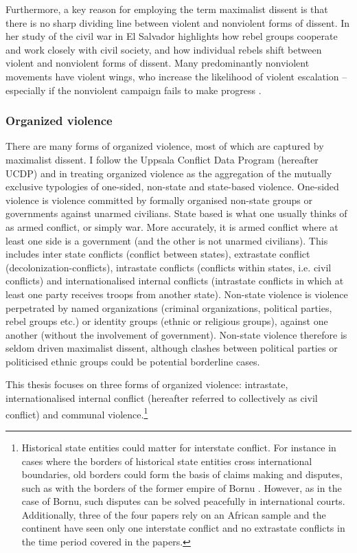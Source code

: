 Furthermore, a key reason for employing the term maximalist dissent is that
there is no sharp dividing line between violent and nonviolent forms of dissent.
In her study of the civil war in El Salvador \citet{Wood2003} highlights how
rebel groups cooperate and work closely with civil society, and how individual
rebels shift between violent and nonviolent forms of dissent. Many predominantly
nonviolent movements have violent wings, who increase the likelihood of
violent escalation -- especially if the nonviolent campaign fails to make
progress \citep{Ryckman_2019}.

\subsubsection{Organized violence}
\label{Organized violence}

There are many forms of organized violence, most of which are captured by
maximalist dissent. I follow the Uppsala Conflict Data Program (hereafter UCDP)
and \citet{Melander_2016} in treating organized violence as the aggregation of
the mutually exclusive typologies of one-sided, non-state and state-based
violence. One-sided violence is violence committed by formally organised
non-state groups or governments against unarmed civilians. State based is what
one usually thinks of as armed conflict, or simply war. More accurately, it is
armed conflict where at least one side is a government (and the other is not
unarmed civilians). This includes inter state conflicts (conflict between
states), extrastate conflict (decolonization-conflicts), intrastate conflicts
(conflicts within states, i.e. civil conflicts) and internationalised internal
conflicts (intrastate conflicts in which at least one party receives troops from
another state). Non-state violence is violence perpetrated by named
organizations (criminal organizations, political parties, rebel groups etc.) or
identity groups (ethnic or religious groups), against one another (without the
involvement of government). Non-state violence therefore is seldom driven
maximalist dissent, although clashes between political parties or politicised
ethnic groups could be potential borderline cases.

This thesis focuses on three forms of organized violence: intrastate,
internationalised internal conflict (hereafter referred to collectively as civil
conflict) and communal violence.\footnote{Historical state entities could matter
	for interstate conflict. For instance in cases where the borders of
	historical state entities cross international boundaries, old borders
	could form the basis of claims making and disputes, such as with the
	borders of the former empire of Bornu \citep{Hariri2012}. However, as in
	the case of Bornu, such disputes can be solved peacefully in
	international courts. Additionally, three of the four papers rely on an
	African sample and the continent have seen only one interstate conflict
and no extrastate conflicts in the time period covered in the papers.} 

